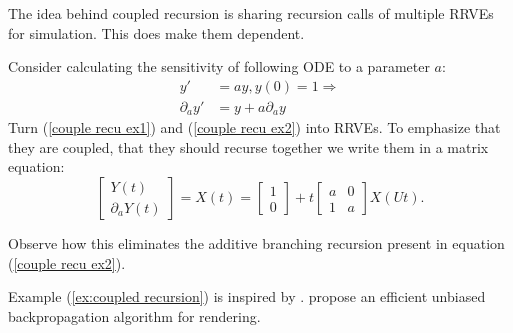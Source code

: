 \documentclass[a4paper,12pt]{article}
\begin{document}
\begin{technique}
    The idea behind coupled recursion is sharing recursion calls of
    multiple RRVEs for simulation. This does make them dependent.
\end{technique}

\begin{example} \label{ex:coupled recursion}
    Consider calculating the
    sensitivity of following ODE to a
    parameter $a$:
    \begin{align}
        y'             & =ay,y(0)=1 \Rightarrow \label{couple recu ex1} \\
        \partial_{a}y' & = y + a \partial_{a}y \label{couple recu ex2}
    \end{align}
    Turn (\ref{couple recu ex1}) and (\ref{couple recu ex2}) into RRVEs.
    To emphasize that they are coupled, that they should
    recurse together we write them in a matrix equation:
    \begin{equation} \label{coupled mat}
        \begin{bmatrix}
            Y(t) \\
            \partial_{a}Y(t)
        \end{bmatrix}=
        X(t)=
        \begin{bmatrix}
            1 \\
            0
        \end{bmatrix}+
        t \begin{bmatrix}
            a & 0 \\
            1 & a
        \end{bmatrix}
        X(Ut).
    \end{equation}

    Observe how this eliminates the additive branching recursion
    present in equation (\ref{couple recu ex2}).

\end{example}

\begin{pythonn} 
\end{pythonn}

\begin{related}
    Example (\ref{ex:coupled recursion}) is inspired by \cite{vicini_path_2021}.
    \cite{vicini_path_2021} propose an efficient unbiased backpropagation
    algorithm for rendering.
\end{related}
\end{document}
